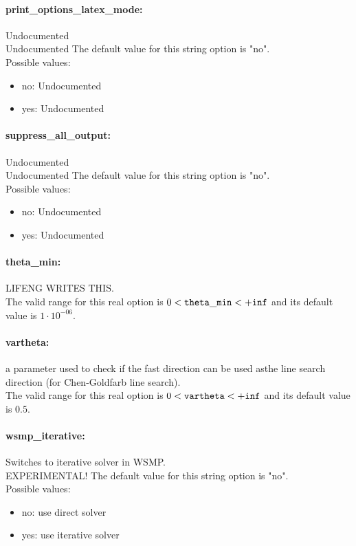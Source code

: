 \paragraph{print\_options\_latex\_mode:}\label{opt:print_options_latex_mode} Undocumented \\
 Undocumented The default value for this string option is "no".
\\ 
Possible values:
\begin{itemize}
   \item no: Undocumented
   \item yes: Undocumented
\end{itemize}

\paragraph{suppress\_all\_output:}\label{opt:suppress_all_output} Undocumented \\
 Undocumented The default value for this string option is "no".
\\ 
Possible values:
\begin{itemize}
   \item no: Undocumented
   \item yes: Undocumented
\end{itemize}

\paragraph{theta\_min:}\label{opt:theta_min} LIFENG WRITES THIS. \\
 The valid range for this real option is 
$0 <  {\tt theta\_min } <  {\tt +inf}$
and its default value is $1 \cdot 10^{-06}$.


\paragraph{vartheta:}\label{opt:vartheta} a parameter used to check if the fast direction can be used asthe line search direction (for Chen-Goldfarb line search). \\
 The valid range for this real option is 
$0 <  {\tt vartheta } <  {\tt +inf}$
and its default value is $0.5$.


\paragraph{wsmp\_iterative:}\label{opt:wsmp_iterative} Switches to iterative solver in WSMP. \\
 EXPERIMENTAL! The default value for this string option is "no".
\\ 
Possible values:
\begin{itemize}
   \item no: use direct solver
   \item yes: use iterative solver
\end{itemize}

